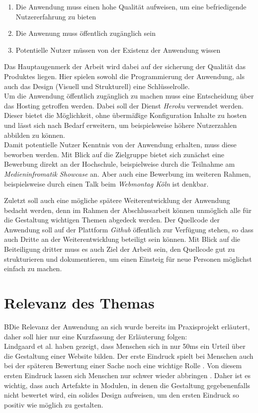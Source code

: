\begin{enumerate}
  \item Die Anwendung muss einen hohe Qualität aufweisen, um eine befriedigende Nutzererfahrung zu bieten
  \item Die Anwenung muss öffentlich zugänglich sein
  \item Potentielle Nutzer müssen von der Existenz der Anwendung wissen
\end{enumerate}

Das Hauptaugenmerk der Arbeit wird dabei auf der sicherung der Qualität das Produktes liegen. Hier spielen sowohl die Programmierung der Anwendung, als auch das Design (Visuell und Strukturell) eine Schlüsselrolle. \\
Um die Anwendung öffentlich zugänglich zu machen muss eine Entscheidung über das Hosting getroffen werden. Dabei soll der Dienst \textit{Heroku} verwendet werden. Dieser bietet die Möglichkeit, ohne übermäßige Konfiguration Inhalte zu hosten und lässt sich nach Bedarf erweitern, um beispielsweise höhere Nutzerzahlen abbilden zu können. \\
Damit potentielle Nutzer Kenntnis von der Anwendung erhalten, muss diese beworben werden. Mit Blick auf die Zielgruppe bietet sich zunächst eine Bewerbung direkt an der Hochschule, beispielweise durch die Teilnahme am \textit{Medieninfromatik Showcase} an. Aber auch eine Bewerbung im weiteren Rahmen, beispielsweise durch einen Talk beim \textit{Webmontag Köln} ist denkbar.

Zuletzt soll auch eine mögliche spätere Weiterentwicklung der Anwendung bedacht werden, denn im Rahmen der Abschlussarbeit können unmöglich alle für die Gestaltung wichtigen Themen abgedeck werden. Der Quellcode der Anwendung soll auf der Plattform \textit{Github} öffentlich zur Verfügung stehen, so dass auch Dritte an der Weiterentwicklung beteiligt sein können. Mit Blick auf die Beiteiligung dritter muss es auch Ziel der Arbeit sein, den Quellcode gut zu strukturieren und dokumentieren, um einen Einsteig für neue Personen möglichst einfach zu machen.

\section{Relevanz des Themas}
BDie Relevanz der Anwendung an sich wurde bereits im Praxisprojekt erläutert, daher soll hier nur eine Kurzfassung der Erläuterung folgen:\\
Lindgaard et al. \cite{lindgaard2006attention} haben gezeigt, dass Menschen sich in nur 50ms ein Urteil über die Gestaltung einer Website bilden. Der erste Eindruck spielt bei Menschen auch bei der späteren Bewertung einer Sache noch eine wichtige Rolle \cite{campbell1996fitting}. Von diesem ersten Eindruck lassen sich Menschen nur schwer wieder abbringen \cite{nickerson1998confirmation}.
Daher ist es wichtig, dass auch Artefakte in Modulen, in denen die Gestaltung gegebenenfalls nicht bewertet wird, ein solides Design aufweisen, um den ersten Eindruck so positiv wie möglich zu gestalten.

